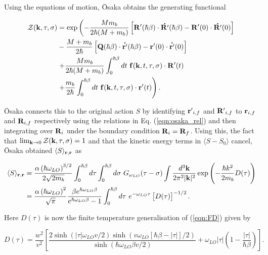 Using the equations of motion, \=Osaka obtains the generating functional

\begin{equation}
    \begin{aligned}
        \mathcal{Z}(\vb{k}, \tau, \sigma) &= \exp \left(  -\frac{M m_b}{2\hbar (M + m_b)} \left[ \vb{R'}(\hbar\beta) \cdot \vb{\dot{R'}}(\hbar\beta) - \vb{R'}(0) \cdot \vb{\dot{R'}}(0) \right] \right. \\ 
        &- \frac{M + m_b}{2\hbar}  \left[ \vb{Q}(\hbar\beta) \cdot \vb{\dot{r'}}(\hbar\beta) - \vb{r'}(0) \cdot \vb{\dot{r'}}(0) \right] \\
        &\left. + \frac{M m_b}{2 \hbar (M + m_b)} \int_0^{\hbar\beta} dt\ \vb{f}(\vb{k}, t, \tau, \sigma) \cdot \vb{R'}(t) \right. \\
        &\left. + \frac{m_b}{2 \hbar} \int_0^{\hbar\beta} dt\ \vb{f}(\vb{k}, t, \tau, \sigma) \cdot \vb{r'}(t) \right).
    \end{aligned}
\end{equation}

\=Osaka connects this to the original action $S$ by identifying $\vb{r'}_{i,f}$ and $\vb{R'}_{i,f}$ to $\vb{r}_{i,f}$ and $\vb{R}_{i,f}$ respectively using the relations in Eq. (\ref{eqn:osaka_rel}) and then integrating over $\vb{R}_i$ under the boundary condition $\vb{R}_i = \vb{R}_f$. Using this, the fact that $\lim_{\vb{k}\to 0} \mathcal{Z}(\vb{k}, \tau, \sigma) = 1$ and that the kinetic energy terms in $\langle S - S_0 \rangle$ cancel, \=Osaka obtained $\langle S \rangle_{\vb{r}, \vb{r}}$ as

\begin{equation}
    \begin{aligned}
        \langle S \rangle_{\vb{r}, \vb{r}} &= \frac{\alpha \left(\hbar \omega_{LO}\right)^{3/2}}{2\sqrt{2 m_b}} \int^{\hbar\beta}_0 d\tau \int^{\hbar\beta}_0 d\sigma\ G_{\omega_{LO}}(\tau - \sigma) \int \frac{d^3\vb{k}}{2\pi^2|\vb{k}|^2} \exp \left(-\frac{\hbar k^2}{2m_b} D(\tau)\right) \\
        &= \frac{\alpha \left( \hbar \omega_{LO}\right)^{2}}{\sqrt{\pi}} \frac{\beta e^{\hbar\omega_{LO}\beta}}{e^{\hbar\omega_{LO}\beta} - 1} \int^{\hbar\beta}_0 d\tau\ e^{-\omega_{LO}\tau} \left[D(\tau) \right]^{-1/2}.
    \end{aligned}
\end{equation}

Here $D(\tau)$ is now the finite temperature generalisation of (\ref{eqn:FD}) given by

\begin{equation}
    D(\tau) = \frac{w^2}{v^2} \left[ \frac{2\sinh(|\tau|\omega_{LO} v/2) \sinh(v \omega_{LO}[\hbar\beta - |\tau|] / 2)}{\sinh(\hbar\omega_{LO}\beta v /2)} + \omega_{LO}|\tau| \left(1 - \frac{|\tau|}{\hbar\beta}\right)\right].
\end{equation}

